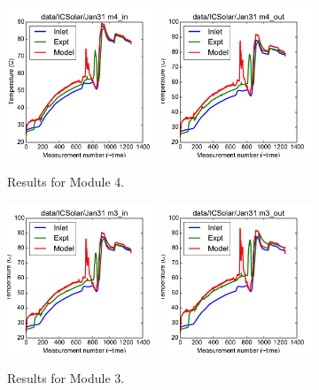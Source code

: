 \documentclass{article}
\begin{document}
\clearpage
\begin{figure}[!ht]
\centering
\includegraphics[width=0.4\textwidth]{../../data/ICSolar/images/Jan31_m4_in.pdf}\hspace{0.05\textwidth}
\includegraphics[width=0.4\textwidth]{../../data/ICSolar/images/Jan31_m4_out.pdf}\hspace{0.05\textwidth}\\
\caption{Results for Module 4.}\end{figure}
\begin{figure}[!ht]
\centering
\includegraphics[width=0.4\textwidth]{../../data/ICSolar/images/Jan31_m3_in.pdf}\hspace{0.05\textwidth}
\includegraphics[width=0.4\textwidth]{../../data/ICSolar/images/Jan31_m3_out.pdf}\hspace{0.05\textwidth}\\
\caption{Results for Module 3.}\end{figure}
\end{document}
